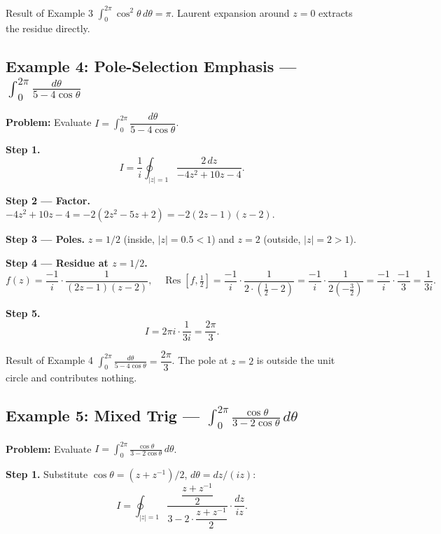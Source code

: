 \documentclass[12pt,a4paper]{article}
\begin{document}
\begin{learnbox}{Result of Example 3}
$\displaystyle\int_0^{2\pi}\cos^2\theta\,d\theta = \pi$. Laurent expansion
around $z=0$ extracts the residue directly.
\end{learnbox}

\subsection*{Example 4: Pole-Selection Emphasis --- $\displaystyle\int_0^{2\pi}\frac{d\theta}{5-4\cos\theta}$}

\textbf{Problem:} Evaluate $I = \int_0^{2\pi}\dfrac{d\theta}{5-4\cos\theta}$.

\textbf{Step 1.}
\[
  I = \frac{1}{i}\oint_{|z|=1}\frac{2\,dz}{-4z^2 + 10z - 4}.
\]

\textbf{Step 2 --- Factor.} $-4z^2 + 10z - 4 = -2(2z^2 - 5z + 2) = -2(2z-1)(z-2)$.

\textbf{Step 3 --- Poles.} $z = 1/2$ (inside, $|z|=0.5<1$) and $z = 2$ (outside, $|z|=2>1$).

\textbf{Step 4 --- Residue at $z = 1/2$.}
\[
  f(z) = \frac{-1}{i} \cdot \frac{1}{(2z-1)(z-2)}, \quad
  \operatorname{Res}\!\left[f,\tfrac{1}{2}\right]
    = \frac{-1}{i} \cdot \frac{1}{2 \cdot (\tfrac{1}{2}-2)}
    = \frac{-1}{i} \cdot \frac{1}{2(-\tfrac{3}{2})}
    = \frac{-1}{i} \cdot \frac{-1}{3}
    = \frac{1}{3i}.
\]

\textbf{Step 5.}
\[
  I = 2\pi i \cdot \frac{1}{3i} = \frac{2\pi}{3}.
\]

\begin{learnbox}{Result of Example 4}
$\displaystyle\int_0^{2\pi}\frac{d\theta}{5-4\cos\theta} = \dfrac{2\pi}{3}$.
The pole at $z=2$ is outside the unit circle and contributes nothing.
\end{learnbox}

\subsection*{Example 5: Mixed Trig --- $\displaystyle\int_0^{2\pi}\frac{\cos\theta}{3-2\cos\theta}\,d\theta$}

\textbf{Problem:} Evaluate $I = \displaystyle\int_0^{2\pi}\frac{\cos\theta}{3-2\cos\theta}\,d\theta$.

\textbf{Step 1.} Substitute $\cos\theta = (z+z^{-1})/2$, $d\theta = dz/(iz)$:
\[
  I = \oint_{|z|=1} \frac{\dfrac{z+z^{-1}}{2}}{3-2\cdot\dfrac{z+z^{-1}}{2}}\cdot\frac{dz}{iz}.
\]
\end{document}
